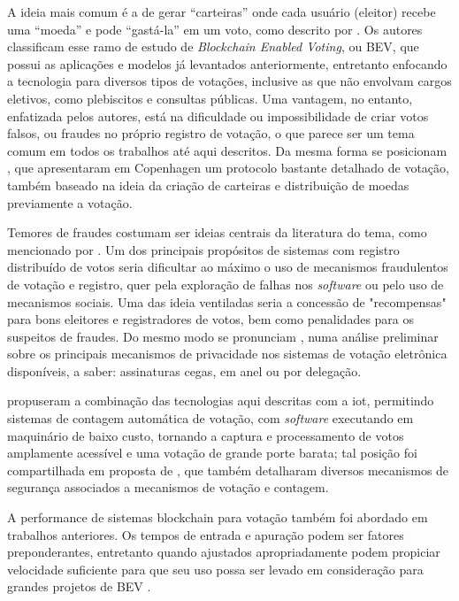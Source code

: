 A ideia mais comum é a de gerar “carteiras” onde cada usuário (eleitor) recebe uma “moeda” e pode “gastá-la” em um voto, como descrito por . Os autores classificam esse ramo de estudo de \textit{Blockchain Enabled Voting}, ou BEV, que possui as aplicações e modelos já levantados anteriormente, entretanto enfocando a tecnologia para diversos tipos de votações, inclusive as que não envolvam cargos eletivos, como plebiscitos e consultas públicas. Uma vantagem, no entanto, enfatizada pelos autores, está na dificuldade ou impossibilidade de criar votos falsos, ou fraudes no próprio registro de votação, o que parece ser um tema comum em todos os trabalhos até aqui descritos. Da mesma forma se posicionam , que apresentaram em Copenhagen um protocolo bastante detalhado de votação, também baseado na ideia da criação de carteiras e distribuição de moedas previamente a votação.  

Temores de fraudes costumam ser ideias centrais da literatura do tema, como mencionado por . Um dos principais propósitos de sistemas com registro distribuído de votos seria dificultar ao máximo o uso de mecanismos fraudulentos de votação e registro, quer pela exploração de falhas nos \textit{software} ou pelo uso de mecanismos sociais. Uma das ideia ventiladas seria a concessão de "recompensas" para bons eleitores e registradores de votos, bem como penalidades para os suspeitos de fraudes. Do mesmo modo se pronunciam , numa análise preliminar sobre os principais mecanismos de privacidade nos sistemas de votação eletrônica disponíveis, a saber: assinaturas cegas, em anel ou por delegação.  

 propuseram a combinação das tecnologias aqui descritas com a \gls{iot}, permitindo sistemas de contagem automática de votação, com \textit{software} executando em maquinário de baixo custo, tornando a captura e processamento de votos amplamente acessível e uma votação de grande porte barata; tal posição foi compartilhada em proposta de , que também detalharam diversos mecanismos de segurança associados a mecanismos de votação e contagem. 

A performance de sistemas blockchain para votação também foi abordado em trabalhos anteriores. Os tempos de entrada e apuração podem ser fatores preponderantes, entretanto quando ajustados apropriadamente podem propiciar velocidade suficiente para que seu uso possa ser levado em consideração para grandes projetos de BEV \cite{Khan2020}.  

